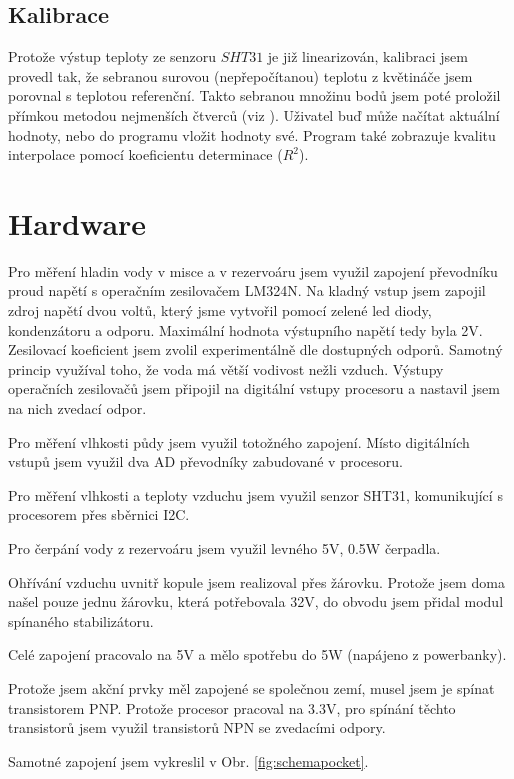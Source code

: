 \documentclass[11pt,a4paper]{article}
\begin{document}
	\subsection{Kalibrace}
	Protože výstup teploty ze senzoru $SHT31$ je již linearizován, kalibraci jsem provedl tak, že sebranou surovou (nepřepočítanou) teplotu z květináče jsem porovnal s teplotou referenční. Takto sebranou množinu bodů jsem poté proložil přímkou metodou nejmenších čtverců (viz \cite{bib:kalibrace}). Uživatel buď může načítat aktuální hodnoty, nebo do programu vložit hodnoty své. Program také zobrazuje kvalitu interpolace pomocí koeficientu determinace ($R^2$).
	
	\section{Hardware}
	
	Pro měření hladin vody v misce a v rezervoáru jsem využil zapojení převodníku proud napětí s operačním zesilovačem LM324N. Na kladný vstup jsem zapojil zdroj napětí dvou voltů, který jsme vytvořil pomocí zelené led diody, kondenzátoru a odporu. Maximální hodnota výstupního napětí tedy byla 2V. Zesilovací koeficient jsem zvolil experimentálně dle dostupných odporů. Samotný princip využíval toho, že voda má větší vodivost nežli vzduch. Výstupy operačních zesilovačů jsem připojil na digitální vstupy procesoru a nastavil jsem na nich zvedací odpor.	

	
	Pro měření vlhkosti půdy jsem využil totožného zapojení. Místo digitálních vstupů jsem využil dva AD převodníky zabudované v procesoru. 
	
	Pro měření vlhkosti a teploty vzduchu jsem využil senzor SHT31, komunikující s procesorem přes sběrnici I2C.
	
	Pro čerpání vody z rezervoáru jsem využil levného 5V, 0.5W čerpadla. 
	
	Ohřívání vzduchu uvnitř kopule jsem realizoval přes žárovku. Protože jsem doma našel pouze jednu žárovku, která potřebovala 32V, do obvodu jsem přidal modul spínaného stabilizátoru. 
	
	Celé zapojení pracovalo na 5V a mělo spotřebu do 5W (napájeno z powerbanky).
	
	Protože jsem akční prvky měl zapojené se společnou zemí, musel jsem je spínat transistorem PNP. Protože procesor pracoval na 3.3V, pro spínání těchto transistorů jsem využil transistorů NPN se zvedacími odpory.
	
	Samotné zapojení jsem vykreslil v Obr. \ref{fig:schemapocket}.
	
\end{document}
